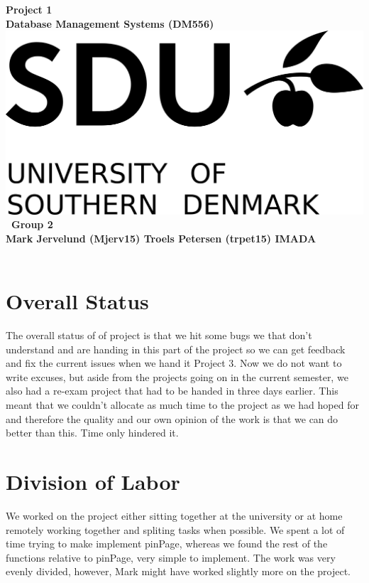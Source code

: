 \documentclass[a4paper,10pt,titlepage]{report}
\date{}
\begin{document}
\begin{titlepage}
\centering
    \vspace*{9\baselineskip}
    \huge
    \bfseries
    Project 1\\
    
    \normalfont 
	\huge    
    Database Management Systems (DM556)  \\[4\baselineskip]
    \normalfont
	\includegraphics[scale=1.5]{SDU_Logo}
    \vfill\
    Group 2\\
    Mark Jervelund (Mjerv15) Troels Petersen (trpet15)
    \vspace{5mm}
    IMADA \\
    \textbf{\datedate} \\[2\baselineskip]
\end{titlepage}

\setcounter{page}{1}
\renewcommand{\thepage}{\arabic{page}}

\lstset{language=Java}          %
\section{Overall Status}
The overall status of of project is that we hit some bugs we that don't understand and are handing in this part of the project so we can get feedback and fix the current issues when we hand it Project 3.  Now we do not want to write excuses, but aside from the projects going on in the current semester, we also had a re-exam project that had to be handed in three days earlier. This meant that we couldn't allocate as much time to the project as we had hoped for and therefore the quality and our own opinion of the work is that we can do better than this. Time only hindered it.
\section{Division of Labor}
We worked on the project either sitting together at the university or at home remotely working together and spliting tasks when possible. We spent a lot of time trying to make implement pinPage, whereas we found the rest of the functions relative to pinPage, very simple to implement. The work was very evenly divided, however, Mark might have worked slightly more on the project.
\end{document}

